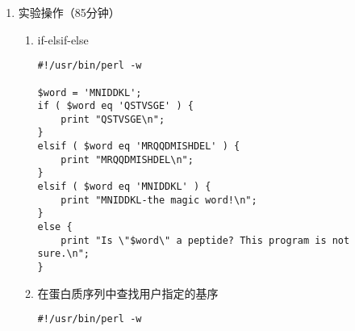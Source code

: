 \documentclass{TIJMUjiaoanSY}
\begin{document}
\firstTail

\newpage
\otherHeader

\begin{enumerate}
\vspace{-1em}
\vspace{-1em}
  \item 实验操作（85分钟）
    \begin{enumerate}
      \item if-elsif-else
\begin{verbatim}
#!/usr/bin/perl -w

$word = 'MNIDDKL';
if ( $word eq 'QSTVSGE' ) {
    print "QSTVSGE\n";
}
elsif ( $word eq 'MRQQDMISHDEL' ) {
    print "MRQQDMISHDEL\n";
}
elsif ( $word eq 'MNIDDKL' ) {
    print "MNIDDKL-the magic word!\n";
}
else {
    print "Is \"$word\" a peptide? This program is not sure.\n";
}
\end{verbatim}

      \item 在蛋白质序列中查找用户指定的基序
\begin{verbatim}
#!/usr/bin/perl -w


\end{verbatim}
\end{enumerate}
\end{enumerate}
\end{document}

